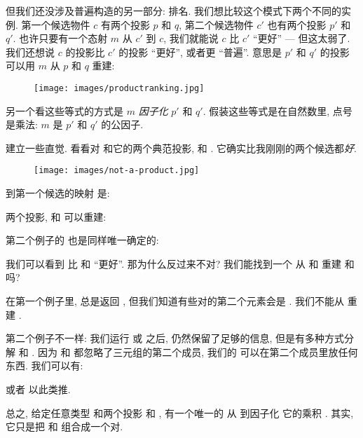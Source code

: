 但我们还没涉及普遍构造的另一部分: 排名. 我们想比较这个模式下两个不同的实例. 第一个候选物件 $c$ 有两个投影 $p$ 和 $q$,
第二个候选物件 $c'$ 也有两个投影 $p'$ 和 $q'$. 也许只要有一个态射 $m$ 从 $c'$ 到 $c$, 我们就能说 $c$ 比 $c'$ ``更好''
--- 但这太弱了. 我们还想说 $c$ 的投影比 $c'$ 的投影 ``更好'', 或者更 ``普遍''. 意思是 $p'$ 和 $q'$ 的投影可以用
$m$ 从 $p$ 和 $q$ 重建:


\begin{figure}[H]
  \centering
  \texttt{[image: images/productranking.jpg]}
\end{figure}

\noindent
另一个看这些等式的方式是 $m$ \emph{因子化} $p'$ 和 $q'$. 假装这些等式是在自然数里, 点号是乘法: $m$ 是 $p'$ 和 $q'$ 的公因子.

建立一些直觉. 看看对  和它的两个典范投影,  和 . 它确实比我刚刚的两个候选都\emph{好}.

\begin{figure}[H]
  \centering
  \texttt{[image: images/not-a-product.jpg]}
\end{figure}

\noindent
到第一个候选的映射  是:

两个投影,  和  可以重建:

第二个例子的  也是同样唯一确定的:

我们可以看到  比  和  ``更好''. 那为什么反过来不对?
我们能找到一个  从  和  重建  和  吗?

在第一个例子里,  总是返回 , 但我们知道有些对的第二个元素会是 . 我们不能从  重建
.

第二个例子不一样: 我们运行  或  之后, 仍然保留了足够的信息, 但是有多种方式分解  和 .
因为  和  都忽略了三元组的第二个成员, 我们的  可以在第二个成员里放任何东西. 我们可以有:


或者
以此类推.

总之, 给定任意类型  和两个投影  和 , 有一个唯一的  从  到因子化
它的乘积 . 其实, 它只是把  和  组合成一个对.

